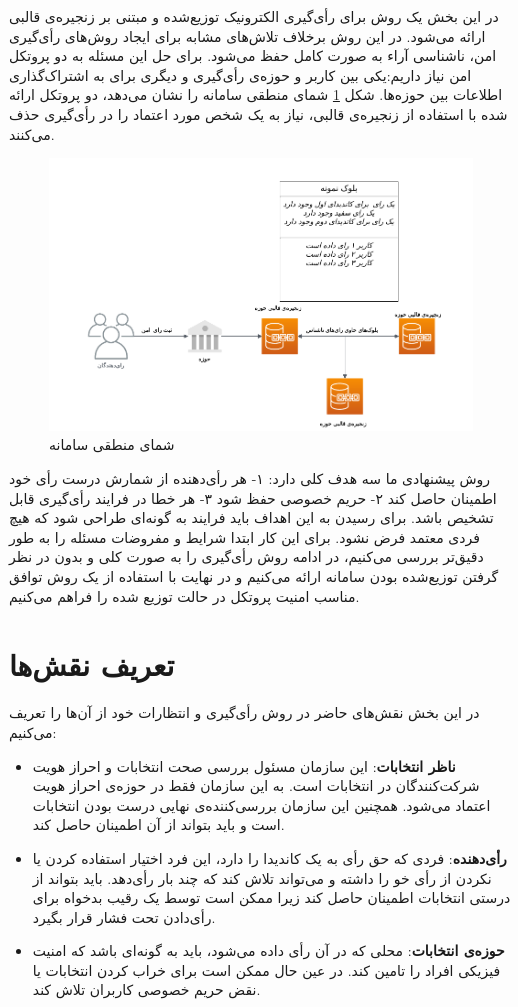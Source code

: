 در این بخش یک روش برای رأی‌گیری الکترونیک توزیع‌شده و مبتنی بر زنجیره‌ی قالبی ارائه می‌شود. در این روش برخلاف تلاش‌های مشابه برای ایجاد روش‌های رأی‌گیری امن، ناشناسی آراء به صورت کامل حفظ می‌شود. برای حل این مسئله به دو پروتکل امن نیاز داریم:یکی بین کاربر و حوزه‌ی رأی‌گیری و دیگری برای به اشتراک‌گذاری اطلاعات بین حوزه‌ها. شکل \ref{fig:toplevel} شمای منطقی سامانه را نشان می‌دهد، دو پروتکل ارائه شده با استفاده از زنجیره‌ی قالبی، نیاز به یک شخص مورد اعتماد را در رأی‌گیری حذف می‌کنند.
\begin{figure}[h!]
	\centering
	\includegraphics[width=1\linewidth]{toplevel.png}
	\caption {شمای منطقی سامانه}
	\label{fig:toplevel}
\end{figure}


\par
روش پیشنهادی ما سه هدف کلی دارد: ۱- هر رأی‌دهنده از شمارش درست رأی خود اطمینان حاصل کند ۲- حریم خصوصی حفظ شود ۳- هر خطا در فرایند رأی‌گیری قابل تشخیص باشد. برای رسیدن به این اهداف باید فرایند به گونه‌ای طراحی شود که هیچ فردی معتمد فرض نشود. برای این کار ابتدا شرایط و مفروضات مسئله را به طور دقیق‌تر بررسی می‌کنیم، در ادامه روش رأی‌گیری را به صورت کلی و بدون در نظر گرفتن توزیع‌شده بودن سامانه ارائه می‌کنیم و در نهایت با استفاده از یک روش توافق مناسب امنیت پروتکل در حالت توزیع شده را فراهم می‌کنیم. 
\section{تعریف نقش‌ها}
در این بخش نقش‌های حاضر در روش رأی‌گیری و انتظارات خود از آن‌ها را تعریف می‌کنیم:
\begin{itemize}
	\item
	\textbf{ناظر انتخابات}:
	این سازمان مسئول بررسی صحت انتخابات و احراز هویت شرکت‌کنندگان در انتخابات است. به این سازمان فقط در حوزه‌ی احراز هویت اعتماد می‌شود. همچنین این سازمان بررسی‌کننده‌ی نهایی درست بودن انتخابات است و باید بتواند از آن اطمینان حاصل کند.
	\item
	\textbf{رأی‌دهنده}:
	فردی که حق رأی به یک کاندیدا را دارد، این فرد اختیار استفاده کردن یا نکردن از رأی خو را داشته و می‌تواند تلاش کند که چند بار رأی‌دهد. باید بتواند از درستی انتخابات اطمینان حاصل کند زیرا ممکن است توسط یک رقیب بدخواه برای رأی‌دادن تحت فشار قرار بگیرد.
	\item
	\textbf{حوزه‌ی انتخابات}:
	محلی که در آن رأی داده می‌شود، باید به گونه‌ای باشد که امنیت فیزیکی افراد را تامین کند. در عین حال ممکن است برای خراب کردن انتخابات یا نقض حریم خصوصی کاربران تلاش کند. 
\end{itemize}
